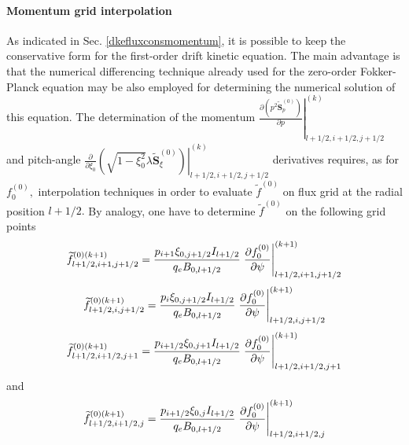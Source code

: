 \paragraph{Momentum grid interpolation}

As indicated in Sec. \ref{dkefluxconsmomentum}, it is possible to keep the
conservative form for the first-order drift kinetic equation. The main
advantage is that the numerical differencing technique already used for the
zero-order Fokker-Planck equation may be also employed for determining the
numerical solution of this equation. The determination of the momentum $%
\left. \frac{\partial \left( p^{2}\widetilde{\mathbf{S}}_{p}^{\left(
0\right) }\right) }{\partial p}\right| _{l+1/2,i+1/2,j+1/2}^{(k)}$ and
pitch-angle $\left. \frac{\partial }{\partial \xi _{0}}\left( \sqrt{1-\xi
_{0}^{2}}\lambda \widetilde{\mathbf{S}}_{\xi }^{\left( 0\right) }\right)
\right| _{l+1/2,i+1/2,j+1/2}^{(k)}$ derivatives requires, as for $%
f_{0}^{\left( 0\right) },$ interpolation techniques in order to evaluate $%
\widetilde{f}^{(0)}$ on flux grid at the radial position $l+1/2.$ By
analogy, one have to determine $\widetilde{f}^{(0)}$ on the following grid
points
\begin{equation}
\widetilde{f}_{l+1/2,i+1,j+1/2}^{\left( 0\right) (k+1)}=\frac{p_{i+1}\xi
_{0,j+1/2}I_{l+1/2}}{q_{e}B_{0,l+1/2}}\left. \frac{\partial f_{0}^{(0)}}{%
\partial \psi }\right| _{l+1/2,i+1,j+1/2}^{(k+1)}
\end{equation}
\begin{equation}
\widetilde{f}_{l+1/2,i,j+1/2}^{\left( 0\right) (k+1)}=\frac{p_{i}\xi
_{0,j+1/2}I_{l+1/2}}{q_{e}B_{0,l+1/2}}\left. \frac{\partial f_{0}^{(0)}}{%
\partial \psi }\right| _{l+1/2,i,j+1/2}^{(k+1)}
\end{equation}
\begin{equation}
\widetilde{f}_{l+1/2,i+1/2,j+1}^{\left( 0\right) (k+1)}=\frac{p_{i+1/2}\xi
_{0,j+1}I_{l+1/2}}{q_{e}B_{0,l+1/2}}\left. \frac{\partial f_{0}^{(0)}}{%
\partial \psi }\right| _{l+1/2,i+1/2,j+1}^{(k+1)}
\end{equation}
and
\begin{equation}
\widetilde{f}_{l+1/2,i+1/2,j}^{\left( 0\right) (k+1)}=\frac{p_{i+1/2}\xi
_{0,j}I_{l+1/2}}{q_{e}B_{0,l+1/2}}\left. \frac{\partial f_{0}^{(0)}}{%
\partial \psi }\right| _{l+1/2,i+1/2,j}^{(k+1)}
\end{equation}

